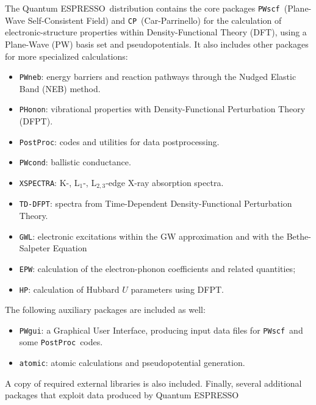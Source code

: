 \documentclass[12pt,a4paper]{article}
\def\qe{{\sc Quantum ESPRESSO}}
\def\PWscf{\texttt{PWscf}}
\def\PHonon{\texttt{PHonon}}
\def\CP{\texttt{CP}}
\def\PostProc{\texttt{PostProc}}
\def\NEB{\texttt{PWneb}}
\begin{document}
The \qe\ distribution contains the core packages \PWscf\ (Plane-Wave
Self-Consistent Field) and \CP\ (Car-Parrinello) for the calculation
of electronic-structure properties within
Density-Functional Theory (DFT), using a Plane-Wave (PW) basis set
and pseudopotentials. It also includes other packages for
more specialized calculations:
\begin{itemize}
  \item \NEB:
        energy barriers and reaction pathways through the Nudged Elastic Band
        (NEB) method.
      \item \PHonon:
        vibrational properties  with Density-Functional Perturbation Theory
        (DFPT).
  \item \PostProc:
        codes and utilities for data postprocessing.
  \item \texttt{PWcond}:
        ballistic conductance.
  \item \texttt{XSPECTRA}:
        K-, L$_1$-, L$_{2,3}$-edge X-ray absorption spectra.
  \item \texttt{TD-DFPT}:
        spectra from Time-Dependent
        Density-Functional Perturbation Theory.
  \item \texttt{GWL}: electronic excitations within the GW approximation
        and with the Bethe-Salpeter Equation      
  \item \texttt{EPW}: calculation of the electron-phonon coefficients
        and related quantities;
  \item \texttt{HP}: calculation of Hubbard $U$ parameters using DFPT.
\end{itemize}
The following auxiliary packages are included as well:
\begin{itemize}
\item \texttt{PWgui}:
      a Graphical User Interface, producing input data files for
      \PWscf\ and some \PostProc\ codes.
\item \texttt{atomic}:
      atomic calculations and pseudopotential generation.
\end{itemize}
A copy of required external libraries is also included.
Finally, several additional packages that exploit data produced by \qe\
\end{document}
